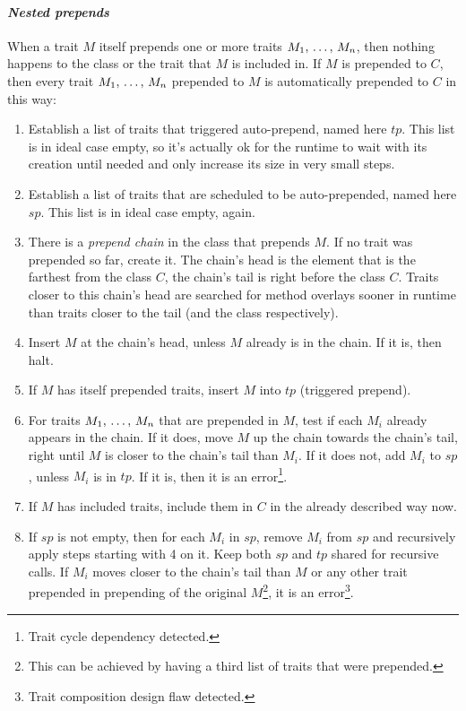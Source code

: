 \paragraph{\em Nested prepends}
When a trait $M$ itself prepends one or more traits $M_1 ,\, \ldots ,\, M_n$, then nothing happens to the class or the trait that $M$ is included in. If $M$ is prepended to $C$, then every trait $M_1 ,\, \ldots ,\, M_n$ prepended to $M$ is automatically prepended to $C$ in this way:
\begin{enumerate}
\item
Establish a list of traits that triggered auto-prepend, named here $tp$. This list is in ideal case empty, so it's actually ok for the runtime to wait with its creation until needed and only increase its size in very small steps. 

\item
Establish a list of traits that are scheduled to be auto-prepended, named here $sp$. This list is in ideal case empty, again. 

\item
There is a {\em prepend chain} in the class that prepends $M$. If no trait was prepended so far, create it. The chain's head is the element that is the farthest from the class $C$, the chain's tail is right before the class $C$. Traits closer to this chain's head are searched for method overlays sooner in runtime than traits closer to the tail (and the class respectively). 

\item
Insert $M$ at the chain's head, unless $M$ already is in the chain. If it is, then halt. 

\item 
If $M$ has itself prepended traits, insert $M$ into $tp$ (triggered prepend). 

\item
For traits $M_1 ,\, \ldots ,\, M_n$ that are prepended in $M$, test if each $M_i$ already appears in the chain. If it does, move $M$ up the chain towards the chain's tail, right until $M$ is closer to the chain's tail than $M_i$. If it does not, add $M_i$ to $sp$, unless $M_i$ is in $tp$. If it is, then it is an error\footnote{Trait cycle dependency detected.}. 

\item
If $M$ has included traits, include them in $C$ in the already described way now. 

\item
If $sp$ is not empty, then for each $M_i$ in $sp$, remove $M_i$ from $sp$ and recursively apply steps starting with 4 on it. Keep both $sp$ and $tp$ shared for recursive calls. If $M_i$ moves closer to the chain's tail than $M$ or any other trait prepended in prepending of the original $M$\footnote{This can be achieved by having a third list of traits that were prepended.}, it is an error\footnote{Trait composition design flaw detected.}. 
\end{enumerate}

